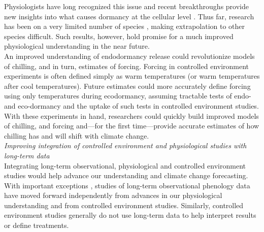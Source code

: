 \documentclass[11pt,letter]{article}
\begin{document}
Physiologists have long recognized this issue and recent breakthroughs provide new insights into what causes dormancy at the cellular level \citep{vanderschoot2014}. Thus far, research has been on a very limited number of species \citep{Singh:2017,rinne2018}, making extrapolation to other species difficult. Such results, however, hold promise for a much improved physiological understanding in the near future.\\

An improved understanding of endodormancy release could revolutionize models of chilling, and in turn, estimates of forcing. Forcing in controlled environment experiments is often defined simply as warm temperatures (or warm temperatures after cool temperatures). Future estimates could more accurately define forcing using only temperatures during ecodormancy, assuming tractable tests of endo- and eco-dormancy and the uptake of such tests in controlled environment studies. With these experiments in hand, researchers could quickly build improved models of chilling, and forcing and---for the first time---provide accurate estimates of how chilling has and will shift with climate change.\\ 

\emph{Improving integration of controlled environment and physiological studies with long-term data}\\
Integrating long-term observational, physiological and controlled environment studies would help advance our understanding and climate change forecasting. With important exceptions \citep[e.g.,][]{gauzere2017}, studies of long-term observational phenology data have moved forward independently from advances in our physiological understanding and from controlled environment studies. Similarly, controlled environment studies generally do not use long-term data to help interpret results or define treatments. \\
\end{document}
